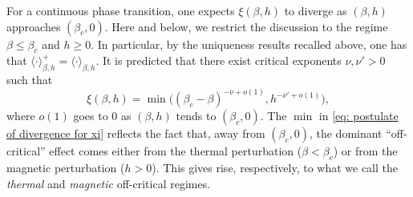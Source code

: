 \documentclass[10pt,a4paper]{amsart}
\numberwithin{equation}{section}
\begin{document}
For a continuous phase transition, one expects $\xi(\beta,h)$ to 
diverge as $(\beta,h)$ approaches $(\beta_c,0)$. Here and below, we restrict the discussion to the regime $\beta\leq \beta_c$ and $h\geq 0$. In particular, by the uniqueness results recalled above, one has that $\langle \cdot\rangle^+_{\beta,h}=\langle \cdot\rangle_{\beta,h}$. It is predicted that there exist critical exponents $\nu,\nu'>0$ such that
\begin{equation}\label{eq: postulate of divergence for xi}
	\xi(\beta,h)=\min\bigl( (\beta_c-\beta)^{-\nu +o(1)},h^{-\nu'+o(1)}\bigr),
\end{equation}
where $o(1)$ goes to $0$ as $(\beta,h)$ tends to $(\beta_c,0)$.
The $\min$ in \eqref{eq: postulate of divergence for xi} reflects 
the fact that, away from $(\beta_c,0)$, the dominant ``off-critical'' effect comes 
either from the thermal perturbation ($\beta<\beta_c$) or from the 
magnetic perturbation ($h>0$). This gives rise, respectively, to what we call the \emph{thermal} and 
\emph{magnetic} off-critical regimes. 
\end{document}
